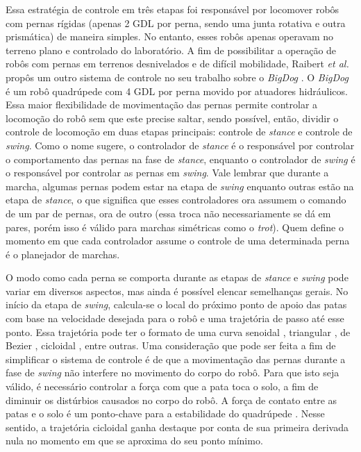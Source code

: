 \documentclass[conference]{IEEEtran}
\begin{document}
Essa estratégia de controle em três etapas foi responsável por locomover robôs com pernas rígidas (apenas 2 GDL por perna, sendo uma junta rotativa e outra prismática) de maneira simples. No entanto, esses robôs apenas operavam no terreno plano e controlado do laboratório. A fim de possibilitar a operação de robôs com pernas em terrenos desnivelados e de difícil mobilidade, Raibert \textit{et al.} propôs um outro sistema de controle no seu trabalho sobre o \textit{BigDog} \cite{RAIBERT200810822}. O \textit{BigDog} é um robô quadrúpede com 4 GDL por perna movido por atuadores hidráulicos. Essa maior flexibilidade de movimentação das pernas permite controlar a locomoção do robô sem que este precise saltar, sendo possível, então, dividir o controle de locomoção em duas etapas principais: controle de \textit{stance} e controle de \textit{swing}. Como o nome sugere, o controlador de \textit{stance} é o responsável por controlar o comportamento das pernas na fase de \textit{stance}, enquanto o controlador de \textit{swing} é o responsável por controlar as pernas em \textit{swing}. Vale lembrar que durante a marcha, algumas pernas podem estar na etapa de \textit{swing} enquanto outras estão na etapa de \textit{stance}, o que significa que esses controladores ora assumem o comando de um par de pernas, ora de outro (essa troca não necessariamente se dá em pares, porém isso é válido para marchas simétricas como o \textit{trot}). Quem define o momento em que cada controlador assume o controle de uma determinada perna é o planejador de marchas.

O modo como cada perna se comporta durante as etapas de \textit{stance} e \textit{swing} pode variar em diversos aspectos, mas ainda é possível elencar semelhanças gerais. No início da etapa de \textit{swing}, calcula-se o local do próximo ponto de apoio das patas com base na velocidade desejada para o robô e uma trajetória de passo até esse ponto. Essa trajetória pode ter o formato de uma curva senoidal \cite{X.118}, triangular \cite{StanfordPupper}, de Bezier \cite{HackadayQuadruped}, cicloidal \cite{Shi2021} \cite{X.58}, entre outras. Uma consideração que pode ser feita a fim de simplificar o sistema de controle é de que a movimentação das pernas durante a fase de \textit{swing} não interfere no movimento do corpo do robô. Para que isto seja válido, é necessário controlar a força com que a pata toca o solo, a fim de diminuir os distúrbios causados no corpo do robô. A força de contato entre as patas e o solo é um ponto-chave para a estabilidade do quadrúpede \cite{X.118}. Nesse sentido, a trajetória cicloidal ganha destaque por conta de sua primeira derivada nula no momento em que se aproxima do seu ponto mínimo.
\end{document}

